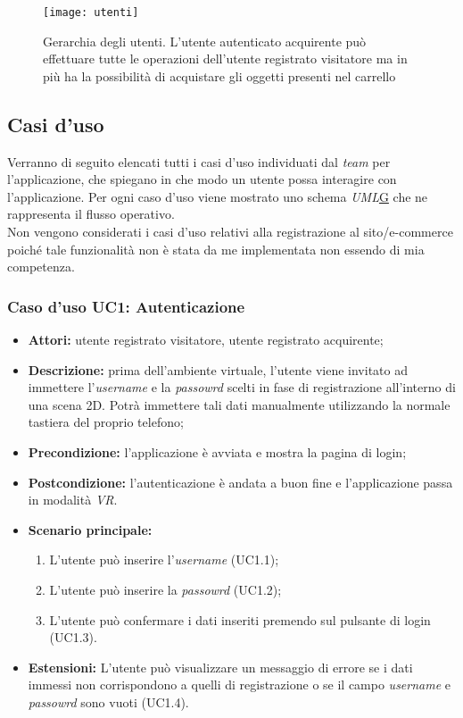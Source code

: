 \label{Gerarchia utenti}
\begin{figure}[ht]
	\begin{center}
		\texttt{[image: utenti]}
		\caption{Gerarchia degli utenti. L'utente autenticato acquirente può effettuare tutte le operazioni dell'utente registrato visitatore ma in più ha la possibilità di acquistare gli oggetti presenti nel carrello}
	\end{center}
\end{figure}
\FloatBarrier

\subsection{Casi d'uso}

Verranno di seguito elencati tutti i casi d'uso individuati dal \textit{team} per l'applicazione, che spiegano in che modo un utente possa interagire con l'applicazione. Per ogni caso d'uso viene mostrato uno schema \textit{UML}\hyperlink{uml}{G} che ne rappresenta il flusso operativo. \\ 
Non vengono considerati i casi d'uso relativi alla registrazione al sito/e-commerce poiché tale funzionalità non è stata da me implementata non essendo di mia competenza.

\subsubsection{Caso d'uso UC1: Autenticazione}

\begin{itemize}
	\item \textbf{Attori:} utente registrato visitatore, utente registrato acquirente;
	\item \textbf{Descrizione:} prima dell'ambiente virtuale, l'utente viene invitato ad immettere l'\textit{username} e la \textit{passowrd} scelti in fase di registrazione all'interno di una scena 2D. Potrà immettere tali dati manualmente utilizzando la normale tastiera del proprio telefono;
	\item \textbf{Precondizione:} l'applicazione è avviata e mostra la pagina di login;
	\item \textbf{Postcondizione:} l'autenticazione è andata a buon fine e l'applicazione passa in modalità \textit{VR}.
	\item \textbf{Scenario principale:}
	\begin{enumerate}
		\item L'utente può inserire l'\textit{username} (UC1.1);
		\item L'utente può inserire la \textit{passowrd} (UC1.2);
		\item L'utente può confermare i dati inseriti premendo sul pulsante di login (UC1.3).
	\end{enumerate}
	\item \textbf{Estensioni:} L'utente può visualizzare un messaggio di errore se i dati immessi non corrispondono a quelli di registrazione o se il campo \textit{username} e \textit{passowrd} sono vuoti (UC1.4).
\end{itemize}

